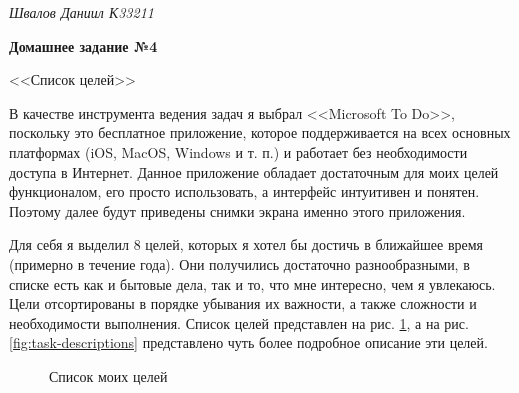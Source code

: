 \documentclass[a4paper, 14pt]{extarticle}
\begin{document}
\begin{flushright}
  \textit{Швалов Даниил К33211}
\end{flushright}

\begin{center}
  \bfseries
  Домашнее задание №4

  <<Список целей>>
\end{center}

В качестве инструмента ведения задач я выбрал <<Microsoft To Do>>, поскольку
это бесплатное приложение, которое поддерживается на всех основных платформах
(iOS, MacOS, Windows и т. п.) и работает без необходимости доступа в Интернет.
Данное приложение обладает достаточным для моих целей функционалом, его просто
использовать, а интерфейс интуитивен и понятен. Поэтому далее будут приведены
снимки экрана именно этого приложения.

Для себя я выделил 8 целей, которых я хотел бы достичь в ближайшее время
(примерно в течение года). Они получились достаточно разнообразными, в списке
есть как и бытовые дела, так и то, что мне интересно, чем я увлекаюсь. Цели
отсортированы в порядке убывания их важности, а также сложности и необходимости
выполнения. Список целей представлен на рис. \ref{fig:task-list}, а на рис.
\ref{fig:task-descriptions} представлено чуть более подробное описание эти
целей.

\begin{figure}[H]
  \centering
  \caption{Список моих целей}
  \label{fig:task-list}
\end{figure}
\end{document}
